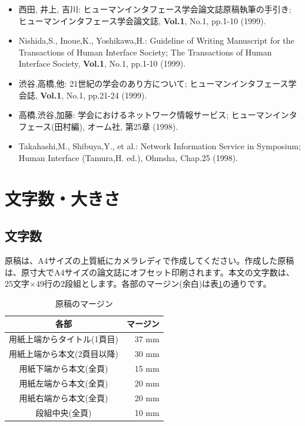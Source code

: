 \documentclass{hissymp}
\begin{document}
	{\small
	\begin{itemize}
	\item[{[1]}]
		西田, 井上, 吉川:
		ヒューマンインタフェース学会論文誌原稿執筆の手引き;
		ヒューマンインタフェース学会論文誌,
		{\bf Vol.1}, No.1, pp.1-10 (1999).
	\item[{[2]}]
		Nishida,S., Inoue,K., Yoshikawa,H.:
		Guideline of Writing Manuscript for the Transactions of Human Interface Society;
		The Transactions of Human Interface Society,
		{\bf Vol.1}, No.1, pp.1-10 (1999).
	\item[{[3]}]
		渋谷,高橋,他:
		21世紀の学会のあり方について;
		ヒューマンインタフェース学会誌,
		{\bf Vol.1}, No.1, pp.21-24 (1999).
	\item[{[4]}]
		高橋,渋谷,加藤:
		学会におけるネットワーク情報サービス;
		ヒューマンインタフェース(田村編),
		オーム社, 第25章 (1998).
	\item[{[5]}]
		Takahashi,M., Shibuya,Y., et al.:
		Network Information Service in Symposium;
		Human Interface (Tamura,H. ed.),
		Ohmsha, Chap.25 (1998).
	\end{itemize}}


\section{文字数・大きさ}

\subsection{文字数}
原稿は、A4サイズの上質紙にカメラレディで作成してください。作成した原稿は、原寸大でA4サイズの論文誌にオフセット印刷されます。本文の文字数は、25文字×49行の2段組とします。各部のマージン(余白)は表\ref{table:margin}の通りです。

\begin{table}[bt]
	\begin{center}
	\caption{原稿のマージン}		%
	\label{table:margin}
	\begin{tabular}[hbt]{c r}
	\hline
	\bf 各部 & \bf マージン\\
	\hline
	用紙上端からタイトル(1頁目) & 37 mm\\
	用紙上端から本文(2頁目以降) & 30 mm\\
	用紙下端から本文(全頁) & 15 mm\\
	用紙左端から本文(全頁) & 20 mm\\
	用紙右端から本文(全頁) & 20 mm\\
	段組中央(全頁) & 10 mm\\
	\hline
	\end{tabular}
	\end{center}
\end{table}
\end{document}
